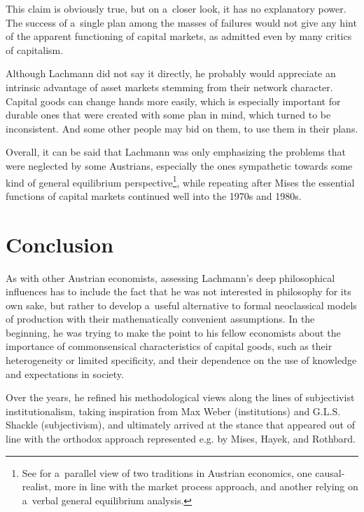{\begin{quote}
\end{quote}

This claim is obviously true, but on a~closer look, it has no explanatory power. The success of a~single plan among the masses of failures would not give any hint of the apparent functioning of capital markets, as admitted even by many critics of capitalism.



Although Lachmann did not say it directly, he probably would appreciate an intrinsic advantage of asset markets stemming from their network character. Capital goods can change hands more easily, which is especially important for durable ones that were created with some plan in mind, which turned to be inconsistent. And some other people may bid on them, to use them in their plans.



Overall, it can be said that Lachmann was only emphasizing the problems that were neglected by some Austrians, especially the ones sympathetic towards some kind of general equilibrium perspective\footnote{See \textcite{salerno-place,salerno-wieser} for a~parallel view of two traditions in Austrian economics, one causal-realist, more in line with the market process approach, and another relying on a~verbal general equilibrium analysis.}, while repeating after Mises the essential functions of capital markets continued well into the 1970s and 1980s.



\section{Conclusion}



As with other Austrian economists, assessing Lachmann's deep philosophical influences has to include the fact that he was not interested in philosophy for its own sake, but rather to develop a~useful alternative to formal neoclassical models of production with their mathematically convenient assumptions. In the beginning, he was trying to make the point to his fellow economists about the importance of commonsensical characteristics of capital goods, such as their heterogeneity or limited specificity, and their dependence on the use of knowledge and expectations in society.



Over the years, he refined his methodological views along the lines of subjectivist institutionalism, taking inspiration from Max Weber (institutions) and G.L.S. Shackle (subjectivism), and ultimately arrived at the stance that appeared out of line with the orthodox approach represented e.g. by Mises, Hayek, and Rothbard.

}
